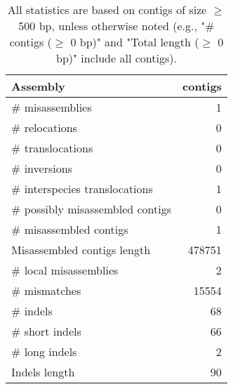 \documentclass[12pt,a4paper]{article}
\begin{document}
\begin{table}[ht]
\begin{center}
\caption{All statistics are based on contigs of size $\geq$ 500 bp, unless otherwise noted (e.g., "\# contigs ($\geq$ 0 bp)" and "Total length ($\geq$ 0 bp)" include all contigs).}
\begin{tabular}{|l*{1}{|r}|}
\hline
Assembly & contigs \\ \hline
\# misassemblies & 1 \\ \hline
\hspace{5mm}\# relocations & 0 \\ \hline
\hspace{5mm}\# translocations & 0 \\ \hline
\hspace{5mm}\# inversions & 0 \\ \hline
\hspace{5mm}\# interspecies translocations & 1 \\ \hline
\# possibly misassembled contigs & 0 \\ \hline
\# misassembled contigs & 1 \\ \hline
Misassembled contigs length & 478751 \\ \hline
\# local misassemblies & 2 \\ \hline
\# mismatches & 15554 \\ \hline
\# indels & 68 \\ \hline
\hspace{5mm}\# short indels & 66 \\ \hline
\hspace{5mm}\# long indels & 2 \\ \hline
Indels length & 90 \\ \hline
\end{tabular}
\end{center}
\end{table}
\end{document}

